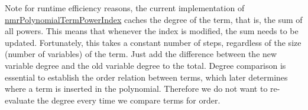 \begin{DoxyNote}{Note}
for runtime efficiency reasons, the current implementation of \hyperlink{classnmr_polynomial_term_power_index}{nmr\-Polynomial\-Term\-Power\-Index} caches the degree of the term, that is, the sum of all powers. This means that whenever the index is modified, the sum needs to be updated. Fortunately, this takes a constant number of steps, regardless of the size (number of variables) of the term. Just add the difference between the new variable degree and the old variable degree to the total. Degree comparison is essential to establish the order relation between terms, which later determines where a term is inserted in the polynomial. Therefore we do not want to re-\/evaluate the degree every time we compare terms for order. 
\end{DoxyNote}


